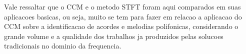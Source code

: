 \documentclass{article}
\begin{document}
	Vale ressaltar que o CCM e o metodo STFT foram aqui comparados em suas aplicacoes basicas, ou seja, muito se tem para fazer em relacao a aplicacao do CCM sobre a identificacao de acordes e melodias polifonicas, considerando o grande volume e a qualidade dos trabalhos ja produzidos pelas solucoes tradicionais no dominio da frequencia.	




%
%
%
%
\end{document}
